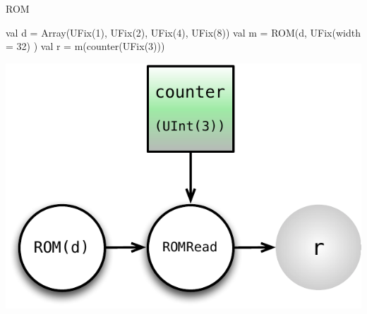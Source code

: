 \documentclass[xcolor=pdflatex,dvipsnames,table]{beamer}
\begin{document}
\begin{frame}[fragile]{ROM}

\begin{scala}
val d = Array(UFix(1), UFix(2), UFix(4), UFix(8))
val m = ROM(d, UFix(width = 32) )
val r = m(counter(UFix(3)))
\end{scala}

\begin{center}
\includegraphics[height=0.7\textheight]{figs/rom.pdf} 
\end{center}

\end{frame}
\end{document}
